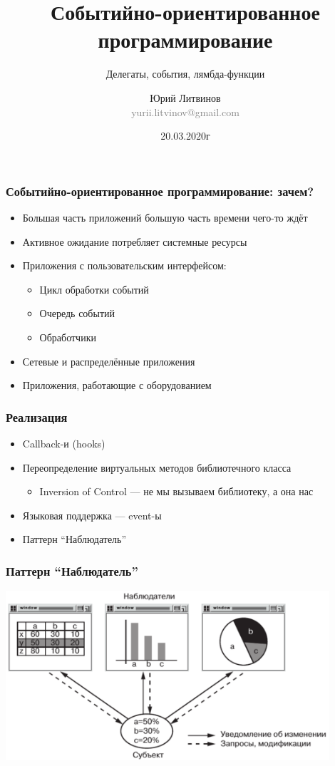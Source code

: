 \documentclass[xetex,mathserif,serif]{beamer}
\title{Событийно-ориентированное программирование}
\subtitle{Делегаты, события, лямбда-функции}
\author[Юрий Литвинов]{Юрий Литвинов\\\small{\textcolor{gray}{yurii.litvinov@gmail.com}}}
\date{20.03.2020г}
\begin{document}
	\frame{\titlepage}

		\begin{frame}
		\frametitle{Событийно-ориентированное программирование: зачем?}
		\begin{itemize}
			\item Большая часть приложений большую часть времени чего-то ждёт
			\item Активное ожидание потребляет системные ресурсы
			\item Приложения с пользовательским интерфейсом:
			\begin{itemize}
				\item Цикл обработки событий
				\item Очередь событий
				\item Обработчики
			\end{itemize}
			\item Сетевые и распределённые приложения
			\item Приложения, работающие с оборудованием
		\end{itemize}
	\end{frame}

	\begin{frame}
		\frametitle{Реализация}
		\begin{itemize}
			\item Callback-и (hooks)
			\item Переопределение виртуальных методов библиотечного класса
			\begin{itemize}
				\item Inversion of Control --- не мы вызываем библиотеку, а она нас
			\end{itemize}
			\item Языковая поддержка --- event-ы
			\item Паттерн ``Наблюдатель''
		\end{itemize}
	\end{frame}

	\begin{frame}
		\frametitle{Паттерн ``Наблюдатель''}
		\begin{center}
			\includegraphics[width=0.9\textwidth]{observerExample.png}
		\end{center}
	\end{frame}
\end{document}

